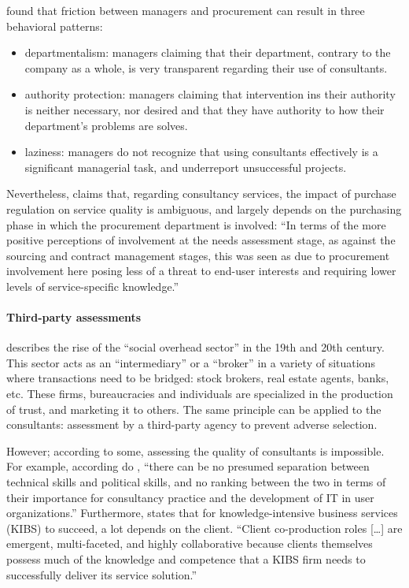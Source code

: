 \documentclass[12pt]{article}
\begin{document}
\citet[305-306]{honer2006} found that friction between managers and
procurement can result in three behavioral patterns:

\begin{itemize}
\item
  departmentalism: managers claiming that their department, contrary to
  the company as a whole, is very transparent regarding their use of
  consultants.
\item
  authority protection: managers claiming that intervention ins their
  authority is neither necessary, nor desired and that they have
  authority to how their department's problems are solves.
\item
  laziness: managers do not recognize that using consultants effectively
  is a significant managerial task, and underreport unsuccessful
  projects.
\end{itemize}

Nevertheless, \citet[164]{lonsdale2017} claims that, regarding
consultancy services, the impact of purchase regulation on service
quality is ambiguous, and largely depends on the purchasing phase in
which the procurement department is involved: ``In terms of the more
positive perceptions of involvement at the needs assessment stage, as
against the sourcing and contract management stages, this was seen as
due to procurement involvement here posing less of a threat to end-user
interests and requiring lower levels of service-specific knowledge.''

\paragraph{Third-party assessments}\label{third-party-assessments}

\citet[57-62]{zucker1985} describes the rise of the ``social overhead
sector'' in the 19th and 20th century. This sector acts as an
``intermediary'' or a ``broker'' in a variety of situations where
transactions need to be bridged: stock brokers, real estate agents,
banks, etc. These firms, bureaucracies and individuals are specialized
in the production of trust, and marketing it to others. The same
principle can be applied to the consultants: assessment by a third-party
agency to prevent adverse selection.

However; according to some, assessing the quality of consultants is
impossible. For example, according do \citet[40]{bloomfield1995},
``there can be no presumed separation between technical skills and
political skills, and no ranking between the two in terms of their
importance for consultancy practice and the development of IT in user
organizations.'' Furthermore, \citet[101-102]{bettencourt2002} states
that for knowledge-intensive business services (KIBS) to succeed, a lot
depends on the client. ``Client co-production roles {[}\ldots{]} are
emergent, multi-faceted, and highly collaborative because clients
themselves possess much of the knowledge and competence that a KIBS firm
needs to successfully deliver its service solution.''
\end{document}
